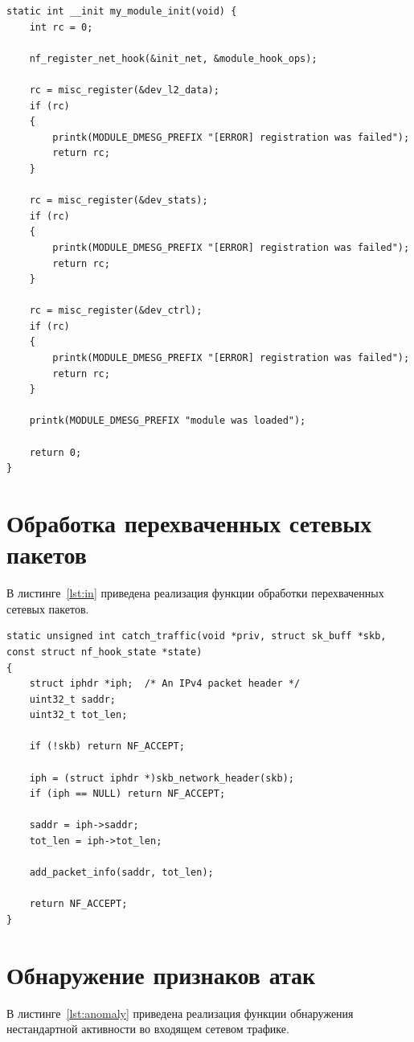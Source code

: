\documentclass{bmstu}
\begin{document}
\begin{lstlisting}[caption = {Функция инициализации модуля}, label=lst:init]
static int __init my_module_init(void) {
    int rc = 0;

    nf_register_net_hook(&init_net, &module_hook_ops);

    rc = misc_register(&dev_l2_data);
    if (rc)
    {
        printk(MODULE_DMESG_PREFIX "[ERROR] registration was failed");
        return rc;
    }

    rc = misc_register(&dev_stats);
    if (rc)
    {
        printk(MODULE_DMESG_PREFIX "[ERROR] registration was failed");
        return rc;
    }

    rc = misc_register(&dev_ctrl);
    if (rc)
    {
        printk(MODULE_DMESG_PREFIX "[ERROR] registration was failed");
        return rc;
    }

    printk(MODULE_DMESG_PREFIX "module was loaded");

    return 0;
}
\end{lstlisting}

\section{Обработка перехваченных сетевых пакетов}
В листинге~\ref{lst:in} приведена реализация функции обработки перехваченных сетевых пакетов.

\begin{lstlisting}[caption = {Функции обработки перехваченных сетевых пакетов}, label=lst:in]
static unsigned int catch_traffic(void *priv, struct sk_buff *skb, const struct nf_hook_state *state)
{
    struct iphdr *iph;  /* An IPv4 packet header */
    uint32_t saddr;
    uint32_t tot_len;

    if (!skb) return NF_ACCEPT;

    iph = (struct iphdr *)skb_network_header(skb);
    if (iph == NULL) return NF_ACCEPT;

    saddr = iph->saddr;
    tot_len = iph->tot_len;

    add_packet_info(saddr, tot_len);

    return NF_ACCEPT;
}
\end{lstlisting}

\section{Обнаружение признаков атак}
В листинге~\ref{lst:anomaly} приведена реализация функции обнаружения нестандартной активности во входящем сетевом трафике.
\end{document}
